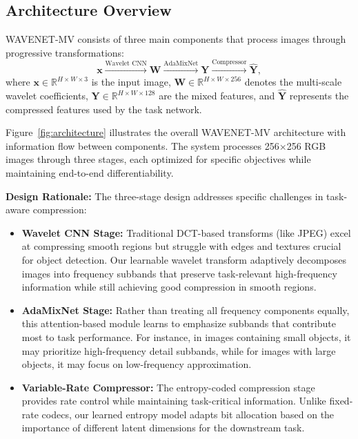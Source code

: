 \documentclass[conference]{IEEEtran}
\begin{document}
\subsection{Architecture Overview}

WAVENET-MV consists of three main components that process images through progressive transformations:
\begin{equation}
\mathbf{x} \xrightarrow{\text{Wavelet CNN}} \mathbf{W} \xrightarrow{\text{AdaMixNet}} \mathbf{Y} \xrightarrow{\text{Compressor}} \hat{\mathbf{Y}},
\end{equation}
where $\mathbf{x} \in \mathbb{R}^{H \times W \times 3}$ is the input image, $\mathbf{W} \in \mathbb{R}^{H \times W \times 256}$ denotes the multi-scale wavelet coefficients, $\mathbf{Y} \in \mathbb{R}^{H \times W \times 128}$ are the mixed features, and $\hat{\mathbf{Y}}$ represents the compressed features used by the task network.

Figure~\ref{fig:architecture} illustrates the overall WAVENET-MV architecture with information flow between components. The system processes 256×256 RGB images through three stages, each optimized for specific objectives while maintaining end-to-end differentiability.

\textbf{Design Rationale:} The three-stage design addresses specific challenges in task-aware compression:
\begin{itemize}
\item \textbf{Wavelet CNN Stage:} Traditional DCT-based transforms (like JPEG) excel at compressing smooth regions but struggle with edges and textures crucial for object detection. Our learnable wavelet transform adaptively decomposes images into frequency subbands that preserve task-relevant high-frequency information while still achieving good compression in smooth regions.
\item \textbf{AdaMixNet Stage:} Rather than treating all frequency components equally, this attention-based module learns to emphasize subbands that contribute most to task performance. For instance, in images containing small objects, it may prioritize high-frequency detail subbands, while for images with large objects, it may focus on low-frequency approximation.
\item \textbf{Variable-Rate Compressor:} The entropy-coded compression stage provides rate control while maintaining task-critical information. Unlike fixed-rate codecs, our learned entropy model adapts bit allocation based on the importance of different latent dimensions for the downstream task.
\end{itemize}
\end{document}
